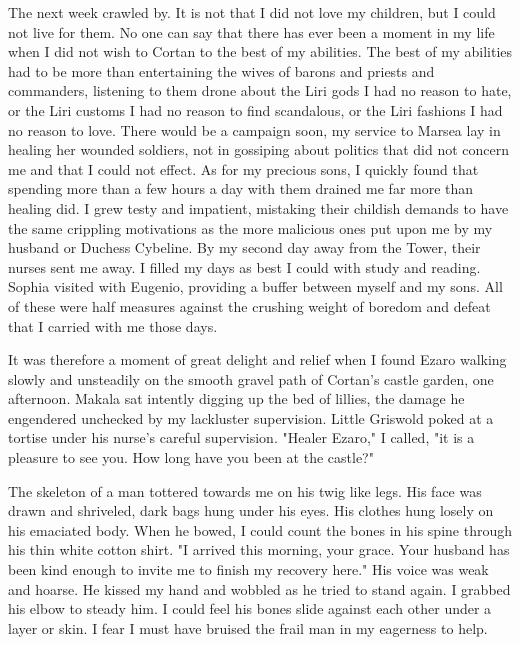 \documentclass{article}
\begin{document}
\vspace{.5cm}


The next week crawled by. It is not that I did not love my children, but I could not live for them. No one can say that there has ever been a moment in my life when I did not wish to Cortan to the best of my abilities. The best of my abilities had to be more than entertaining the wives of barons and priests and commanders, listening to them drone about the Liri gods I had no reason to hate, or the Liri customs I had no reason to find scandalous, or the Liri fashions I had no reason to love. There would be a campaign soon, my service to Marsea lay in healing her wounded soldiers, not in gossiping about politics that did not concern me and that I could not effect. As for my precious sons, I quickly found that spending more than a few hours a day with them drained me far more than healing did. I grew testy and impatient, mistaking their childish demands to have the same crippling motivations as the more malicious ones put upon me by my husband or Duchess Cybeline. By my second day away from the Tower, their nurses sent me away. I filled my days as best I could with study and reading. Sophia visited with Eugenio, providing a buffer between myself and my sons. All of these were half measures against the crushing weight of boredom and defeat that I carried with me those days.

It was therefore a moment of great delight and relief when I found Ezaro walking slowly and unsteadily on the smooth gravel path of Cortan's castle garden, one afternoon. Makala sat intently digging up the bed of lillies, the damage he engendered unchecked by my lackluster supervision. Little Griswold poked at a tortise under his nurse's careful supervision. "Healer Ezaro," I called, "it is a pleasure to see you. How long have you been at the castle?" 

The skeleton of a man tottered towards me on his twig like legs. His face was drawn and shriveled, dark bags hung under his eyes. His clothes hung losely on his emaciated body. When he bowed, I could count the bones in his spine through his thin white cotton shirt. "I arrived this morning, your grace. Your husband has been kind enough to invite me to finish my recovery here." His voice was weak and hoarse. He kissed my hand and wobbled as he tried to stand again. I grabbed his elbow to steady him. I could feel his bones slide against each other under a layer or skin. I fear I must have bruised the frail man in my eagerness to help.
\end{document}
